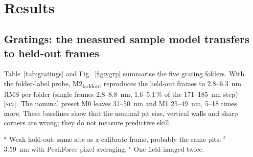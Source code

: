 \documentclass[preprint,12pt]{elsarticle}
\newcommand{\tagm}{\textsc{[meas]}}
\newcommand{\tags}{\textsc{[sim]}}
\begin{document}
\section{Results}
\label{sec:results}

\subsection{Gratings: the measured sample model transfers to held-out frames}

Table~\ref{tab:gratings} and Fig.~\ref{fig:vgrp} summarise the five grating folders. With the
folder-label probe, M2\textsubscript{holdout} reproduces the held-out frames to 2.8--6.3~nm RMS per
folder (single frames 2.8--8.8~nm, 1.6--5.1\,\% of the 171--185~nm step) \tags. The nominal preset
M0 leaves 31--50~nm and M1 25--49~nm, 5--18 times more. These baselines show that the nominal pit
size, vertical walls and sharp corners are wrong; they do not measure predictive skill.

\begin{table}[t]
\centering
\caption{Grating results with the folder-label probe at yaw $+90^\circ$ \tags. Held-out: number of
predict frames (independent sites). RMSE: mean (range) over held-out frames. Discr.: tip
discrimination ratio ($<1$: probe hypotheses indistinguishable). Depth: measured step, mean
$\pm$ SE over frames \tagm.}
\label{tab:gratings}
\small
{}

\smallskip
\raggedright\footnotesize
$^a$ Weak hold-out: same site as a calibrate frame, probably the same pits.
$^b$ 3.59~nm with PeakForce pixel averaging.
$^c$ One field imaged twice.
\end{table}
\end{document}
